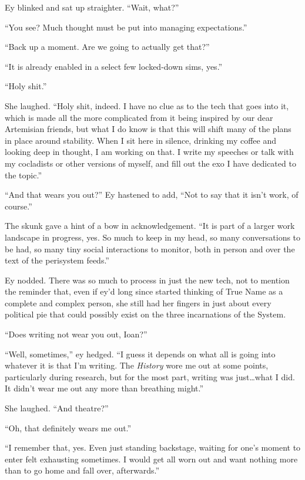Ey blinked and sat up straighter. ``Wait, what?''

``You see? Much thought must be put into managing expectations.''

``Back up a moment. Are we going to actually get that?''

``It is already enabled in a select few locked-down sims, yes.''

``Holy shit.''

She laughed. ``Holy shit, indeed. I have no clue as to the tech that goes into it, which is made all the more complicated from it being inspired by our dear Artemisian friends, but what I do know is that this will shift many of the plans in place around stability. When I sit here in silence, drinking my coffee and looking deep in thought, I am working on that. I write my speeches or talk with my cocladists or other versions of myself, and fill out the exo I have dedicated to the topic.''

``And that wears you out?'' Ey hastened to add, ``Not to say that it isn't work, of course.''

The skunk gave a hint of a bow in acknowledgement. ``It is part of a larger work landscape in progress, yes. So much to keep in my head, so many conversations to be had, so many tiny social interactions to monitor, both in person and over the text of the perisystem feeds.''

Ey nodded. There was so much to process in just the new tech, not to mention the reminder that, even if ey'd long since started thinking of True Name as a complete and complex person, she still had her fingers in just about every political pie that could possibly exist on the three incarnations of the System.

``Does writing not wear you out, Ioan?''

``Well, sometimes,'' ey hedged. ``I guess it depends on what all is going into whatever it is that I'm writing. The \emph{History} wore me out at some points, particularly during research, but for the most part, writing was just\ldots what I did. It didn't wear me out any more than breathing might.''

She laughed. ``And theatre?''

``Oh, that definitely wears me out.''

``I remember that, yes. Even just standing backstage, waiting for one's moment to enter felt exhausting sometimes. I would get all worn out and want nothing more than to go home and fall over, afterwards.''

